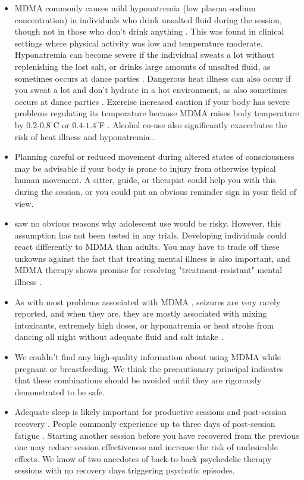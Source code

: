 \documentclass[12pt,letterpaper]{book}
\begin{document}
\begin{itemize}
    \item MDMA commonly causes mild hyponatremia (low plasma sodium concentration) in individuals who drink unsalted fluid during the session, though not in those who don't drink anything \cite{atilaHyponatremia}. This was found in clinical settings where physical activity was low and temperature moderate. Hyponatremia can become severe if the individual sweats a lot without replenishing the lost salt, or drinks large amounts of unsalted fluid, as sometimes occurs at dance parties \cite{vanOverheatingAlcohol}. Dangerous heat illness can also occur if you sweat a lot and don't hydrate in a hot environment, as also sometimes occurs at dance parties \cite{vanOverheatingAlcohol}. Exercise increased caution if your body has severe problems regulating its temperature because MDMA raises body temperature by $0.2$-$0.8^{\circ}$C or $0.4$-$1.4^{\circ}$F \cite{liechti2014effects}. Alcohol co-use also significantly exacerbates the risk of heat illness and hyponatremia \cite{vanOverheatingAlcohol}.
    \item Planning careful or reduced movement during altered states of consciousness may be advisable if your body is prone to injury from otherwise typical human movement. A sitter, guide, or therapist could help you with this during the session, or you could put an obvious reminder sign in your field of view.
    \item \textcite{kangaslampiAdolescent} saw no obvious reasons why adolescent use would be risky. However, this assumption has not been tested in any trials. Developing individuals could react differently to MDMA than adults. You may have to trade off these unkowns against the fact that treating mental illness is also important, and MDMA therapy shows promise for resolving "treatment-resistant" mental illness \cite{mitchellMDMAClinicalTrial}.
    \item As with most problems associated with MDMA \cite{riggDeaths}, seizures are very rarely reported, and when they are, they are mostly associated with mixing intoxicants, extremely high doses, or hyponatremia or heat stroke from dancing all night without adequate fluid and salt intake \cite{freidelSeizures}.
    \item We couldn't find any high-quality information about using MDMA while pregnant or breastfeeding. We think the precautionary principal indicates that these combinations should be avoided until they are rigorously demonstrated to be safe.
    \item Adequate sleep is likely important for productive sessions and post-session recovery \cite{simon2020sleep}. People commonly experience up to three days of post-session fatigue \cite{liechtiGender}. Starting another session before you have recovered from the previous one may reduce session effectiveness and increase the risk of undesirable effects. We know of two anecdotes of back-to-back psychedelic therapy sessions with no recovery days triggering psychotic episodes.

\end{itemize}
\end{document}

